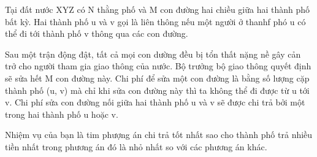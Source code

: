 Tại đất nước XYZ có N thằng phố và M con đường hai chiều giữa hai thành phố bất kỳ. Hai thành phố u và v gọi là liên thông nếu một người ở thanhf phó u có thể đi tới thành phố v thông qua các con đường.

Sau một trận động đật, tất cả mọi con dường đều bị tổn thất nặng nề gây cản trở cho người tham gia giao thông của nước. Bộ trưởng bộ giao thông quyết định sẽ sửa hết M con đường này. Chi phí để sửa một con đường là bằng số lượng cặp thành phố (u, v) mà chỉ khi sửa con đường này thì ta không thể đi được từ u tới v. Chi phí sửa con đường nối giữa hai thành phố u và v sẽ được chi trả bởi một trong hai thành phố u hoặc v.

Nhiệm vụ của bạn là tim phượng án chi trả tốt nhất sao cho thành phố trả nhiều tiền nhất trong phương án đó là nhỏ nhất so với các phương án khác.